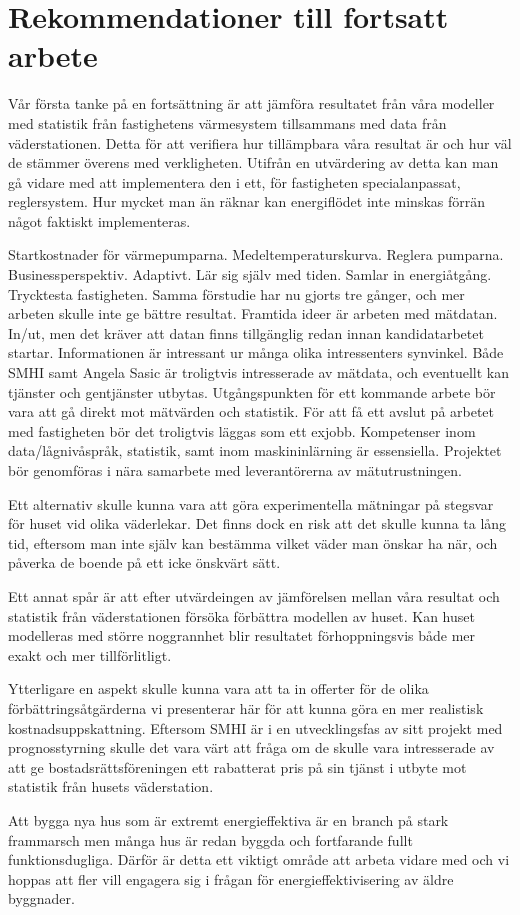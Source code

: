 \section{Rekommendationer till fortsatt arbete}

Vår första tanke på en fortsättning är att jämföra resultatet från våra modeller med 
statistik från fastighetens värmesystem tillsammans med data från väderstationen. Detta för att verifiera hur tillämpbara 
våra resultat är och hur väl de stämmer överens med verkligheten. Utifrån en utvärdering
av detta kan man gå vidare med att implementera den i ett, för fastigheten 
specialanpassat, reglersystem. Hur mycket man än räknar kan energiflödet inte minskas 
förrän något faktiskt implementeras.
 
 
Startkostnader för värmepumparna. Medeltemperaturskurva. Reglera pumparna. Businessperspektiv. Adaptivt. Lär sig själv med tiden. Samlar in energiåtgång. Trycktesta fastigheten.
Samma förstudie har nu gjorts tre gånger, och mer arbeten skulle inte ge bättre resultat. Framtida ideer är arbeten med mätdatan. In/ut, men det kräver att datan finns tillgänglig redan innan kandidatarbetet startar. Informationen är intressant ur många olika intressenters synvinkel. Både SMHI samt Angela Sasic är troligtvis intresserade av mätdata, och eventuellt kan tjänster och gentjänster utbytas.
Utgångspunkten för ett kommande arbete bör vara att gå direkt mot mätvärden och statistik. För att få ett avslut på arbetet med fastigheten bör det troligtvis läggas som ett exjobb. Kompetenser inom data/lågnivåspråk, statistik, samt inom maskininlärning är essensiella. Projektet bör genomföras i nära samarbete med leverantörerna av mätutrustningen.
 

Ett alternativ skulle kunna vara att göra experimentella mätningar på stegsvar för huset
vid olika väderlekar. Det finns dock en risk att det skulle kunna ta lång tid, eftersom man 
inte själv kan bestämma vilket väder man önskar ha när, och påverka de boende på ett 
icke önskvärt sätt.

Ett annat spår är att efter utvärdeingen av jämförelsen mellan våra resultat och statistik 
från väderstationen försöka förbättra modellen av huset. Kan huset modelleras med 
större noggrannhet blir resultatet förhoppningsvis både mer exakt och mer tillförlitligt. %

Ytterligare en aspekt skulle kunna vara att ta in offerter för de olika förbättringsåtgärderna vi presenterar här för att kunna göra en mer realistisk kostnadsuppskattning. Eftersom 
SMHI är i en utvecklingsfas av sitt projekt med prognosstyrning skulle det vara värt att
 fråga om de skulle vara intresserade av att ge bostadsrättsföreningen ett rabatterat pris 
 på sin tjänst i utbyte mot statistik från husets väderstation.

Att bygga nya hus som är extremt energieffektiva är en branch på stark frammarsch men
 många hus är redan byggda och fortfarande fullt funktionsdugliga. Därför är detta ett 
viktigt område att arbeta vidare med och vi hoppas att fler vill engagera sig i frågan för 
energieffektivisering av äldre byggnader.

